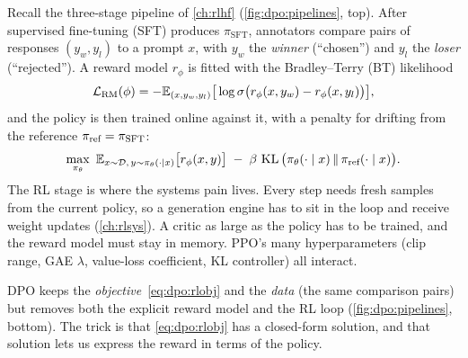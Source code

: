 Recall the three-stage pipeline of \cref{ch:rlhf} (\cref{fig:dpo:pipelines}, top). After
supervised fine-tuning (SFT) produces $\pi_{\text{SFT}}$, annotators compare pairs of responses
$(y_w, y_l)$ to a prompt $x$, with $y_w$ the \emph{winner} (``chosen'') and $y_l$ the \emph{loser}
(``rejected''). A reward model $r_\phi$ is fitted with the Bradley--Terry (BT) likelihood
\begin{equation}
\mathcal{L}_{\text{RM}}(\phi) = -\mathbb{E}_{(x,y_w,y_l)}\big[\log\sigma\big(r_\phi(x,y_w)-r_\phi(x,y_l)\big)\big],
\label{eq:dpo:bt}
\end{equation}
and the policy is then trained online against it, with a penalty for drifting from the reference
$\pi_{\text{ref}}=\pi_{\text{SFT}}$:
\begin{equation}
\max_{\pi_\theta}\ \E_{x\sim\mathcal{D},\,y\sim\pi_\theta(\cdot\mid x)}\big[r_\phi(x,y)\big]
 \;-\;\beta\,\KL\big(\pi_\theta(\cdot\mid x)\,\|\,\piref(\cdot\mid x)\big).
\label{eq:dpo:rlobj}
\end{equation}
The RL stage is where the systems pain lives. Every step needs fresh samples from the current policy,
so a generation engine has to sit in the loop and receive weight updates (\cref{ch:rlsys}). A
critic as large as the policy has to be trained, and the reward model must stay in memory.
PPO's many hyperparameters (clip range, GAE $\lambda$, value-loss coefficient, KL
controller) all interact.

DPO keeps the \emph{objective}~\eqref{eq:dpo:rlobj} and the \emph{data} (the same comparison
pairs) but removes both the explicit reward model and the RL loop
(\cref{fig:dpo:pipelines}, bottom). The trick is that \eqref{eq:dpo:rlobj} has a closed-form
solution, and that solution lets us express the reward in terms of the policy.

